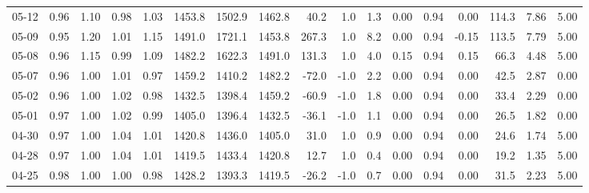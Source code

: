 \begin{threeparttable}
{\begin{tabular}{lrrrrrrrrrrrrrrrr}
  05-12 &         0.96 &           1.10 &          0.98 &          1.03 & 1453.8 & 1502.9 & 1462.8 &       40.2 &                      1.0 &                 1.3 &       0.00 &      0.94 &           0.00 &            114.3 &            7.86 &                   5.00 \\
  05-09 &         0.95 &           1.20 &          1.01 &          1.15 & 1491.0 & 1721.1 & 1453.8 &      267.3 &                      1.0 &                 8.2 &       0.00 &      0.94 &          -0.15 &            113.5 &            7.79 &                   5.00 \\
  05-08 &         0.96 &           1.15 &          0.99 &          1.09 & 1482.2 & 1622.3 & 1491.0 &      131.3 &                      1.0 &                 4.0 &       0.15 &      0.94 &           0.15 &             66.3 &            4.48 &                   5.00 \\
  05-07 &         0.96 &           1.00 &          1.01 &          0.97 & 1459.2 & 1410.2 & 1482.2 &      -72.0 &                     -1.0 &                 2.2 &       0.00 &      0.94 &           0.00 &             42.5 &            2.87 &                   0.00 \\
  05-02 &         0.96 &           1.00 &          1.02 &          0.98 & 1432.5 & 1398.4 & 1459.2 &      -60.9 &                     -1.0 &                 1.8 &       0.00 &      0.94 &           0.00 &             33.4 &            2.29 &                   0.00 \\
  05-01 &         0.97 &           1.00 &          1.02 &          0.99 & 1405.0 & 1396.4 & 1432.5 &      -36.1 &                     -1.0 &                 1.1 &       0.00 &      0.94 &           0.00 &             26.5 &            1.82 &                   0.00 \\
  04-30 &         0.97 &           1.00 &          1.04 &          1.01 & 1420.8 & 1436.0 & 1405.0 &       31.0 &                      1.0 &                 0.9 &       0.00 &      0.94 &           0.00 &             24.6 &            1.74 &                   5.00 \\
  04-28 &         0.97 &           1.00 &          1.04 &          1.01 & 1419.5 & 1433.4 & 1420.8 &       12.7 &                      1.0 &                 0.4 &       0.00 &      0.94 &           0.00 &             19.2 &            1.35 &                   5.00 \\
  04-25 &         0.98 &           1.00 &          1.00 &          0.98 & 1428.2 & 1393.3 & 1419.5 &      -26.2 &                     -1.0 &                 0.7 &       0.00 &      0.94 &           0.00 &             31.5 &            2.23 &                   5.00 \\

\end{tabular}}
\end{threeparttable}
